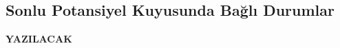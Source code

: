 \documentclass[a4paper,12pt, twoside]{article}
\newcommand{\YAZILACAK}{{\vspace{18pt}\bf\Large \color{red} YAZILACAK}}
\begin{document}
\newpage
\subsection{Sonlu Potansiyel Kuyusunda Bağlı Durumlar}
\YAZILACAK

\newpage
\renewcommand\refname{Kaynaklar}
{}
 
\end{document}
